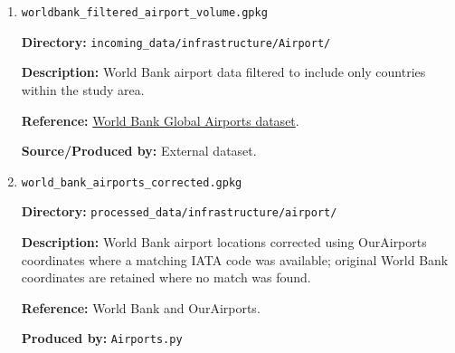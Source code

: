 \documentclass[11pt,a4paper]{article}
\begin{document}
\begin{enumerate}
\medskip

\item \texttt{worldbank\_filtered\_airport\_volume.gpkg}\par
\textbf{Directory:} \texttt{incoming\_data/infrastructure/Airport/}\par
\textbf{Description:} World Bank airport data filtered to include only countries within the study area.\par
\textbf{Reference:} \href{https://datacatalog.worldbank.org/search/dataset/0038117/global-airports}{World Bank Global Airports dataset}.\par
\textbf{Source/Produced by:} External dataset.\par

\medskip

\item \texttt{world\_bank\_airports\_corrected.gpkg}\par
\textbf{Directory:} \texttt{processed\_data/infrastructure/airport/}\par
\textbf{Description:} World Bank airport locations corrected using OurAirports coordinates where a matching IATA code was available; original World Bank coordinates are retained where no match was found.\par
\textbf{Reference:} World Bank and OurAirports.\par
\textbf{Produced by:} \texttt{Airports.py}\par

\end{enumerate}

\endgroup
\end{document}
